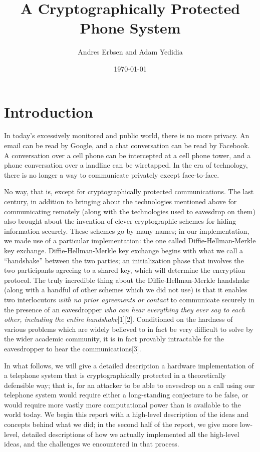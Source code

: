 \documentclass[a4paper]{report}
\title{A Cryptographically Protected Phone System}
\author{Andres Erbsen and Adam Yedidia}
\date{\today}
\begin{document}
\maketitle

\section*{Introduction}

In today's excessively monitored and public world, there is no more privacy. An
email can be read by Google, and a chat conversation can be read by Facebook. A
conversation over a cell phone can be intercepted at a cell phone tower, and a
phone conversation over a landline can be wiretapped. In the era of technology,
there is no longer a way to communicate privately except face-to-face.

No way, that is, except for cryptographically protected communications. The last
century, in addition to bringing about the technologies mentioned above for
communicating remotely (along with the technologies used to eavesdrop on them)
also brought about the invention of clever cryptographic schemes for hiding
information securely. These schemes go by many names; in our implementation, we
made use of a particular implementation: the one called Diffie-Hellman-Merkle key
exchange. Diffie-Hellman-Merkle key exchange begins with what we call a ``handshake'' between the two parties; an initialization phase that involves the two participants agreeing to a shared key, which will %
determine the encryption protocol. The truly incredible thing about the Diffie-Hellman-Merkle handshake (along
with a handful of other schemes which we did not use) is that it enables two
interlocutors \emph{with no prior agreements or contact} to communicate securely
in the presence of an eavesdropper \emph{who can hear everything they ever say
to each other, including the entire handshake}[1][2]. Conditioned on the hardness of various problems which are widely
believed to in fact be very difficult to solve by the wider academic community,
it is in fact provably intractable for the eavesdropper to hear the
communications[3].

In what follows, we will %
give a detailed description a hardware implementation of a telephone
system that is cryptographically protected in a theoretically defensible
way; that is, for an attacker to be able to eavesdrop on a call using our
telephone system would require either a long-standing conjecture to be false, or
would require more vastly more computational power than is available to the
world today. We begin this report with a high-level description of the ideas and concepts behind what we did; in the second half of the report, we give more low-level, detailed descriptions of how we actually implemented all the high-level ideas, and the challenges we encountered in that process.
\end{document}
